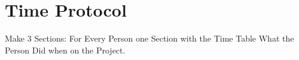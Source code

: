 \chapter{Time Protocol}
\label{chap:Time_Protocol}

Make 3 Sections:
For Every Person one Section with the Time Table What the Person Did when on the Project.
